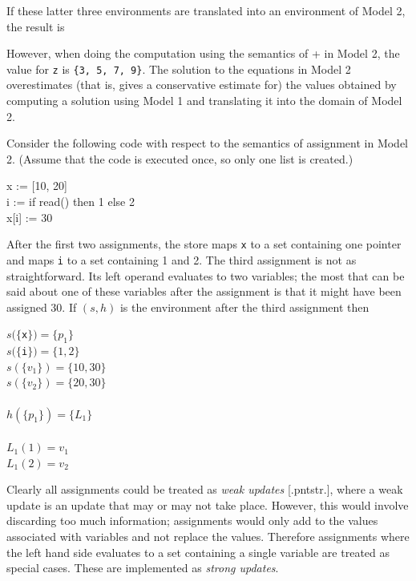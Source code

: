 If these latter three environments are translated into an environment
of Model 2, the result is

\iconline{ \>[x = \{1, 3, 5\}, y = \{2, 4\}, z = \{3, 5, 9\}] }


However, when doing the computation using the semantics of + in Model
2, the value for \texttt{z} is \texttt{\{3, 5, 7, 9\}}. The solution
to the equations in Model 2 overestimates (that is, gives a
conservative estimate for) the values obtained by computing a solution
using Model 1 and translating it into the domain of Model 2.

Consider the following code with respect to the semantics of
assignment in Model 2. (Assume that the code is executed once, so only
one list is created.)

\goodbreak
\begin{iconcode}
\>x := [10, 20]\\
\>i := if read() then 1 else 2\\
\>x[i] := 30\\
\end{iconcode}

After the first two assignments, the store maps \texttt{x} to a set containing
one pointer and maps \texttt{i} to a set containing 1 and 2. The third
assignment is not as straightforward. Its left operand evaluates to
two variables; the most that can be said about one of these variables
after the assignment is that it might have been assigned 30. If $(s, h)$
is the environment after the third assignment then

\goodbreak
\begin{specialcode}{}
\>$s(\{$\texttt{x}$\}) = \{ p_1 \}$\\
\>$s(\{$\texttt{i}$\}) = \{1, 2\}$\\
\>$s(\{v_1\}) = \{10, 30\}$\\
\>$s(\{v_2\}) = \{20, 30\}$\\
\\
\>$h(\{p_1\}) = \{L_1\}$\\
\\
\>$L_1(1) = v_1$\\
\>$L_1(2) = v_2$\\
\end{specialcode}


Clearly all assignments could be treated as \textit{weak updates}
[.pntstr.], where a weak update is an update that may or may not take
place. However, this would involve discarding too much information;
assignments would only add to the values associated with variables and
not replace the values. Therefore assignments where the left hand side
evaluates to a set containing a single variable are treated as special
cases. These are implemented as \textit{strong updates}.

